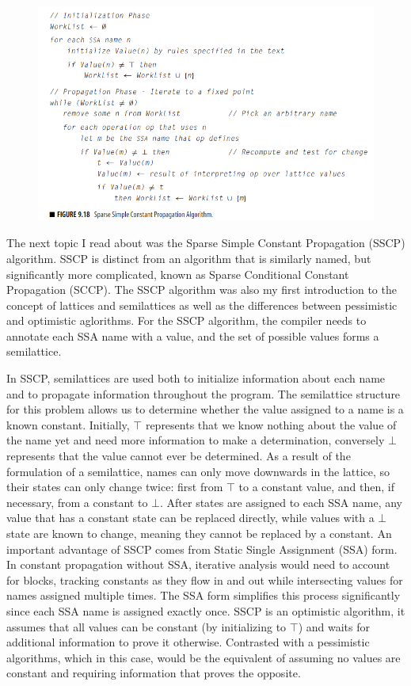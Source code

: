 \documentclass[11pt, a4paper, titlepage]{article}
\begin{document}
\begin{figure}[H]
  \centering
  \includegraphics[scale=0.4]{images/r9.png}
\end{figure}

The next topic I read about was the Sparse Simple Constant Propagation (SSCP) algorithm. SSCP is distinct from an algorithm that is similarly named, but significantly more complicated, known as Sparse Conditional Constant Propagation (SCCP). The SSCP algorithm was also my first introduction to the concept of lattices and semilattices as well as the differences between pessimistic and optimistic aglorithms. For the SSCP algorithm, the compiler needs to annotate each SSA name with a value, and the set of possible values forms a semilattice.

In SSCP, semilattices are used both to initialize information about each name and to propagate information throughout the program.
The semilattice structure for this problem allows us to determine whether the value assigned to a name is a known constant.
Initially, $\top$ represents that we know nothing about the value of the name yet and need more information to make a determination,
conversely $\bot$ represents that the value cannot ever be determined.
As a result of the formulation of a semilattice, names can only move downwards in the lattice,
so their states can only change twice: first from $\top$ to a constant value, and then, if necessary,
from a constant to $\bot$.
After states are assigned to each SSA name, any value that has a constant state can be replaced directly,
while values with a $\bot$ state are known to change, meaning they cannot be replaced by a constant.
An important advantage of SSCP comes from Static Single Assignment (SSA) form.
In constant propagation without SSA, iterative analysis would need to account for blocks,
tracking constants as they flow in and out while intersecting values for names assigned multiple times.
The SSA form simplifies this process significantly since each SSA name is assigned exactly once.
SSCP is an optimistic algorithm, it assumes that all values can be constant (by initializing to $\top$) and waits for additional information to prove it otherwise.
Contrasted with a pessimistic algorithms, which in this case, would be the equivalent of assuming no values are constant and requiring information that proves the opposite.
\end{document}
